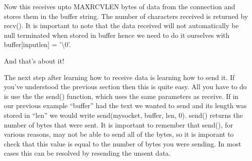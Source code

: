 Now this receives upto MAXRCVLEN bytes of data from the connection and stores
them in the buffer string. The number of characters received is returned by
recv(). It is important to note that the data received will not automatically
be null terminated when stored in buffer hence we need to do it ourselves with
buffer[inputlen] = '\textbackslash{}0'.

And that's about it!

The next step after learning how to receive data is learning how to send it. If
you've understood the previous section then this is quite easy. All you have to
do is use the the send() function, which uses the same parameters as receive.
If in our previous example ``buffer'' had the text we wanted to send and its
length was stored in ``len'' we would write send(mysocket, buffer, len, 0).
send() returns the number of bytes that were sent. It is important to remember
that send(), for various reasons, may not be able to send all of the bytes, so
it is imporant to check that this value is equal to the number of bytes you
were sending. In most cases this can be resolved by resending the unsent data.

